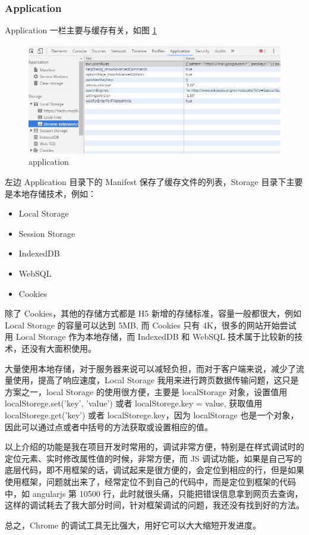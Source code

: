             \subsubsection{Application}
              \label{subsubsec:application}
                Application 一栏主要与缓存有关，如图 \ref{fig:cr_application}
                \begin{figure}[H]
                  \centering
                  \includegraphics[width=12cm]{./img/cr_application.png}
                  \caption{application}
                  \label{fig:cr_application}
                \end{figure}
                左边 Application 目录下的 Manifest 保存了缓存文件的列表，Storage 目录下主要是本地存储技术，例如：
                \begin{itemize}
                  \item Local Storage
                  \item Session Storage
                  \item IndexedDB
                  \item WebSQL
                  \item Cookies
                \end{itemize}
                \par
                除了 Cookies，其他的存储方式都是 H5 新增的存储标准，容量一般都很大，例如 Local Storage 的容量可以达到 5MB, 而 Cookies 只有 4K，很多的网站开始尝试用 Local Storage 作为本地存储，而 IndexedDB 和 WebSQL 技术属于比较新的技术，还没有大面积使用。
                \par
                大量使用本地存储，对于服务器来说可以减轻负担，而对于客户端来说，减少了流量使用，提高了响应速度，Local Storage 我用来进行跨页数据传输问题，这只是方案之一，local Storage 的使用很方便，主要是 localStorage 对象，设置值用 localStorege.set('key', 'value') 或者 localStorege.key = value, 获取值用 localStorege.get('key') 或者 localStorege.key，因为 localStorage 也是一个对象，因此可以通过点或者中括号的方法获取或设置相应的值。
                \par
                以上介绍的功能是我在项目开发时常用的，调试非常方便，特别是在样式调试时的定位元素、实时修改属性值的时候，非常方便，而 JS 调试功能，如果是自己写的底层代码，即不用框架的话，调试起来是很方便的，会定位到相应的行，但是如果使用框架，问题就出来了，经常定位不到自己的代码中，而是定位到框架的代码中，如 angularjs 第 10500 行，此时就很头痛，只能把错误信息拿到网页去查询，这样的调试耗去了我大部分时间，针对框架调试的问题，我还没有找到好的方法。
                \par
                总之，Chrome 的调试工具无比强大，用好它可以大大缩短开发进度。

